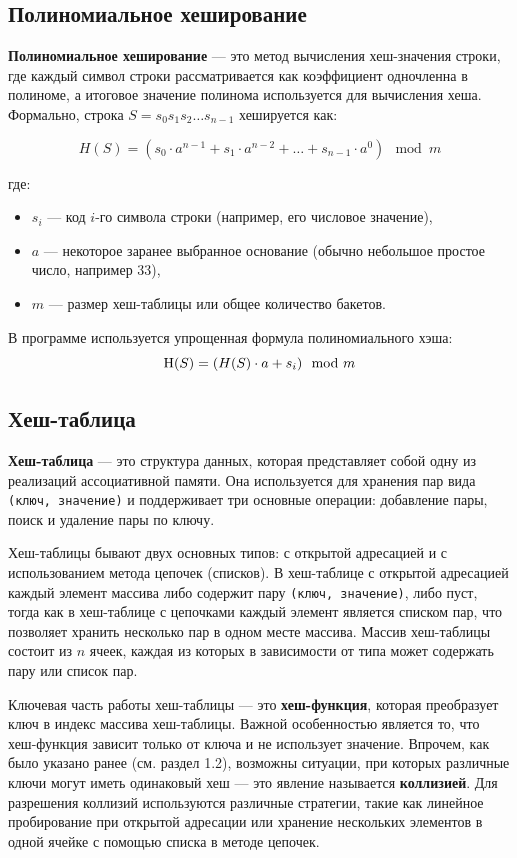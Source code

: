 \documentclass[11pt,a4paper,final]{article} %
\begin{document}
\subsection{Полиномиальное хеширование}

\textbf{Полиномиальное хеширование} — это метод вычисления хеш-значения строки, где каждый символ строки рассматривается как коэффициент одночленна в полиноме, а итоговое значение полинома используется для вычисления хеша. Формально, строка $S = s_0 s_1 s_2 \dots s_{n-1}$ хешируется как:

\[
H(S) = (s_0 \cdot a^{n-1} + s_1 \cdot a^{n-2} + \dots + s_{n-1} \cdot a^0) \mod m
\]

где:
\begin{itemize}
	\item $s_i$ — код $i$-го символа строки (например, его числовое значение),
	\item $a$ — некоторое заранее выбранное основание (обычно небольшое простое число, например 33),
	\item $m$ — размер хеш-таблицы или общее количество бакетов.
\end{itemize}

В программе используется упрощенная формула полиномиального хэша: 
\[
\text H(S) = (H(S) \cdot a + s_{i}) \mod m
\]

\subsection{Хеш-таблица}

\textbf{Хеш-таблица} — это структура данных, которая представляет собой одну из реализаций ассоциативной памяти. Она используется для хранения пар вида \texttt{(ключ, значение)} и поддерживает три основные операции: добавление пары, поиск и удаление пары по ключу.

Хеш-таблицы бывают двух основных типов: с открытой адресацией и с использованием метода цепочек (списков). В хеш-таблице с открытой адресацией каждый элемент массива либо содержит пару \texttt{(ключ, значение)}, либо пуст, тогда как в хеш-таблице с цепочками каждый элемент является списком пар, что позволяет хранить несколько пар в одном месте массива. Массив хеш-таблицы состоит из $n$ ячеек, каждая из которых в зависимости от типа может содержать пару или список пар.

Ключевая часть работы хеш-таблицы — это \textbf{хеш-функция}, которая преобразует ключ в индекс массива хеш-таблицы. Важной особенностью является то, что хеш-функция зависит только от ключа и не использует значение. Впрочем, как было указано ранее (см. раздел 1.2), возможны ситуации, при которых различные ключи могут иметь одинаковый хеш — это явление называется \textbf{коллизией}. Для разрешения коллизий используются различные стратегии, такие как линейное пробирование при открытой адресации или хранение нескольких элементов в одной ячейке с помощью списка в методе цепочек.
\end{document}
